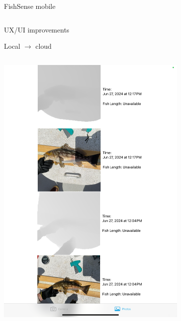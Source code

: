 \begin{frame}{FishSense mobile}
    \begin{column}{0.5\textwidth}
        \item UX/UI improvements
        \item Local $\rightarrow$ cloud
    \end{column}
    \begin{column}{0.5\textwidth}
        \centering
        \includegraphics[height=0.7\textheight,width=0.7\textwidth,keepaspectratio]{images/fs_app.png}
    \end{column}
\end{frame}



